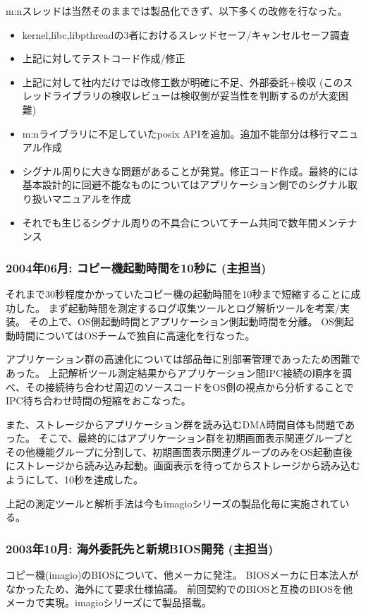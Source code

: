 \documentclass[letterpaper]{article}
\begin{document}
m:nスレッドは当然そのままでは製品化できず、以下多くの改修を行なった。
\begin{itemize}
  \item kernel,libc,libpthreadの3者におけるスレッドセーフ/キャンセルセーフ調査
  \item 上記に対してテストコード作成/修正
  \item 上記に対して社内だけでは改修工数が明確に不足、外部委託+検収 (このスレッドライブラリの検収レビューは検収側が妥当性を判断するのが大変困難)
  \item m:nライブラリに不足していたposix APIを追加。追加不能部分は移行マニュアル作成
  \item シグナル周りに大きな問題があることが発覚。修正コード作成。最終的には基本設計的に回避不能なものについてはアプリケーション側でのシグナル取り扱いマニュアルを作成
  \item それでも生じるシグナル周りの不具合についてチーム共同で数年間メンテナンス
\end{itemize}

\subsubsection*{2004年06月: コピー機起動時間を10秒に (主担当)}
それまで30秒程度かかっていたコピー機の起動時間を10秒まで短縮することに成功した。
まず起動時間を測定するログ収集ツールとログ解析ツールを考案/実装。
その上で、OS側起動時間とアプリケーション側起動時間を分離。
OS側起動時間についてはOSチームで独自に高速化を行なった。

アプリケーション群の高速化については部品毎に別部署管理であったため困難であった。
上記解析ツール測定結果からアプリケーション間IPC接続の順序を調べ、その接続待ち合わせ周辺のソースコードをOS側の視点から分析することでIPC待ち合わせ時間の短縮をおこなった。

また、ストレージからアプリケーション群を読み込むDMA時間自体も問題であった。
そこで、最終的にはアプリケーション群を初期画面表示関連グループとその他機能グループに分割して、初期画面表示関連グループのみをOS起動直後にストレージから読み込み起動。画面表示を待ってからストレージから読み込むようにして、10秒を達成した。

上記の測定ツールと解析手法は今もimagioシリーズの製品化毎に実施されている。

\subsubsection*{2003年10月: 海外委託先と新規BIOS開発 (主担当)}
コピー機(imagio)のBIOSについて、他メーカに発注。
BIOSメーカに日本法人がなかったため、海外にて要求仕様協議。
前回契約でのBIOSと互換のBIOSを他メーカで実現。imagioシリーズにて製品搭載。
\end{document}
